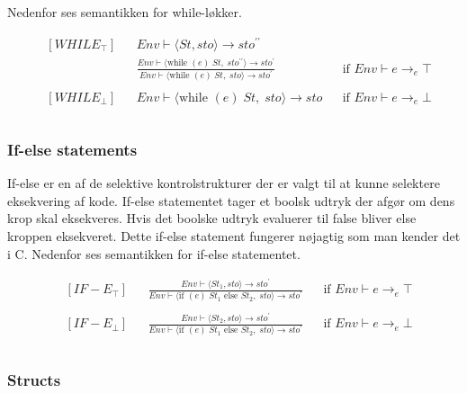 Nedenfor ses semantikken for while-løkker.

\begin{align*}
&[WHILE_\top] & &Env \vdash \langle St, sto \rangle \rightarrow sto^{\prime\prime}\\
& & &\frac{Env \vdash \langle \text{while } (e)\; St,\; sto^{\prime\prime} \rangle \rightarrow sto^\prime}{Env \vdash \langle \text{while } (e)\; St,\; sto \rangle \rightarrow sto^\prime} & &\text{if } Env \vdash e \rightarrow_e \top\\\\
%
&[WHILE_\bot] & &Env \vdash \langle \text{while } (e)\; St,\; sto \rangle \rightarrow sto & &\text{if } Env \vdash e \rightarrow_e \bot\\\\
\end{align*}

\subsubsection*{If-else statements}
If-else er en af de selektive kontrolstrukturer der er valgt til at kunne selektere eksekvering af kode. If-else statementet tager et boolsk udtryk der afgør om dens krop skal eksekveres. Hvis det boolske udtryk evaluerer til false bliver else kroppen eksekveret. Dette if-else statement fungerer nøjagtig som man kender det i C.
Nedenfor ses semantikken for if-else statementet.

\begin{align*}
&[IF-E_\top] & &\frac{Env \vdash \langle St_1, sto \rangle \rightarrow sto^\prime}{Env \vdash \langle \text{if } (e)\;St_1 \text{ else } St_2,\; sto \rangle \rightarrow sto^\prime} & &\text{if } Env \vdash e \rightarrow_e \top\\\\
%
&[IF-E_\bot] & &\frac{Env \vdash \langle St_2, sto \rangle \rightarrow sto^\prime}{Env \vdash \langle \text{if } (e)\; St_1 \text{ else } St_2,\; sto \rangle \rightarrow sto^\prime} & &\text{if } Env \vdash e \rightarrow_e \bot\\\\
\end{align*}


\subsubsection*{Structs}

